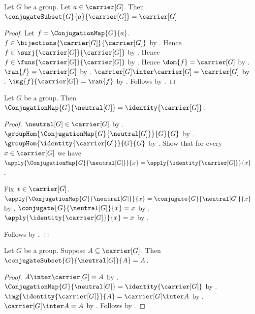 \begin{proposition}\label{conjugate_full_carrier}
    Let $G$ be a group.
    Let $a\in\carrier[G]$.
    Then $\conjugateSubset{G}{a}{\carrier[G]}=\carrier[G]$.
\end{proposition}
\begin{proof}
    Let $f=\ConjugationMap{G}{a}$.
    $f\in\bijections{\carrier[G]}{\carrier[G]}$ by
        .
    Hence $f\in\surj{\carrier[G]}{\carrier[G]}$ by
        .
    Hence $f\in\funs{\carrier[G]}{\carrier[G]}$ by
        .
    Hence $\dom{f}=\carrier[G]$ by
        .
    $\ran{f}=\carrier[G]$ by .
    $\carrier[G]\inter\carrier[G]=\carrier[G]$ by
        .
    $\img{f}{\carrier[G]}=\ran{f}$ by
        .
    Follows by .
\end{proof}

\begin{proposition}\label{conjugation_map_neutral}
    Let $G$ be a group.
    Then
        $\ConjugationMap{G}{\neutral[G]}=
            \identity{\carrier[G]}$.
\end{proposition}
\begin{proof}
    $\neutral[G]\in\carrier[G]$ by
        .
    $\groupHom{\ConjugationMap{G}{\neutral[G]}}{G}{G}$ by
        .
    $\groupHom{\identity{\carrier[G]}}{G}{G}$ by
        .
    Show that for every $x\in\carrier[G]$ we have
        $\apply{\ConjugationMap{G}{\neutral[G]}}{x}=
            \apply{\identity{\carrier[G]}}{x}$.
    \begin{subproof}
        Fix $x\in\carrier[G]$.
        $\apply{\ConjugationMap{G}{\neutral[G]}}{x}=
            \conjugate{G}{\neutral[G]}{x}$ by
            .
        $\conjugate{G}{\neutral[G]}{x}=x$ by
            .
        $\apply{\identity{\carrier[G]}}{x}=x$ by
            .
    \end{subproof}
    Follows by .
\end{proof}

\begin{proposition}\label{conjugate_subset_by_neutral}
    Let $G$ be a group.
    Suppose $A\subseteq\carrier[G]$.
    Then $\conjugateSubset{G}{\neutral[G]}{A}=A$.
\end{proposition}
\begin{proof}
    $A\inter\carrier[G]=A$ by
        .
    $\ConjugationMap{G}{\neutral[G]}=
        \identity{\carrier[G]}$ by
        .
    $\img{\identity{\carrier[G]}}{A}=
        \carrier[G]\inter A$ by .
    $\carrier[G]\inter A=A$ by
        .
    Follows by .
\end{proof}


